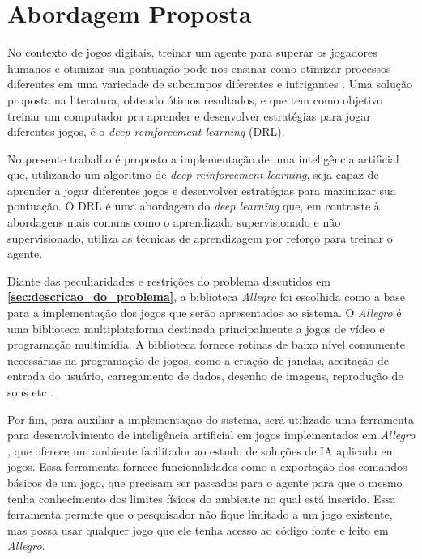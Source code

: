 \chapter{Abordagem Proposta}
\label{chap:abordagem}


No contexto de jogos digitais, treinar um agente para superar os jogadores humanos e otimizar sua pontuação pode nos ensinar como otimizar processos diferentes em uma variedade de subcampos diferentes e intrigantes \cite{comi:teach:AI:DRL:2018}. Uma solução proposta na literatura, obtendo ótimos resultados, e que tem como objetivo treinar um computador pra aprender e desenvolver estratégias para jogar diferentes jogos, é o \textit{deep reinforcement learning} (DRL). 

No presente trabalho é proposto a implementação de uma inteligência artificial que, utilizando um algoritmo de \textit{deep reinforcement learning}, seja capaz de aprender a jogar diferentes jogos e desenvolver estratégias para maximizar sua pontuação. O DRL é uma abordagem do \textit{deep learning} que, em contraste à abordagens mais comuns como o aprendizado supervisionado e não supervisionado, utiliza as técnicas de aprendizagem por reforço para treinar o agente.

Diante das peculiaridades e restrições do problema discutidos em \textbf{\ref{sec:descricao_do_problema}}, a biblioteca \textit{Allegro} foi escolhida como a base para a implementação dos jogos que serão apresentados ao sistema.
O \textit{Allegro} é uma biblioteca multiplataforma destinada principalmente a jogos de vídeo e programação multimídia. A biblioteca fornece rotinas de baixo nível comumente necessárias na programação de jogos, como a criação de janelas, aceitação de entrada do usuário, carregamento de dados, desenho de imagens, reprodução de sons etc \cite{allegro}.

Por fim, para auxiliar a implementação do sistema, será utilizado uma ferramenta para desenvolvimento de inteligência artificial em jogos implementados em \textit{Allegro} \cite{silva:amb-jd-allegro}, que oferece um ambiente facilitador ao estudo de soluções de IA aplicada em jogos. Essa ferramenta fornece funcionalidades como a exportação dos comandos básicos de um jogo, que precisam ser passados para o agente para que o mesmo tenha conhecimento dos limites físicos do ambiente no qual está inserido. Essa ferramenta permite que o pesquisador não fique limitado a um jogo existente, mas possa usar qualquer jogo que ele tenha acesso ao código fonte e feito em \textit{Allegro}.


